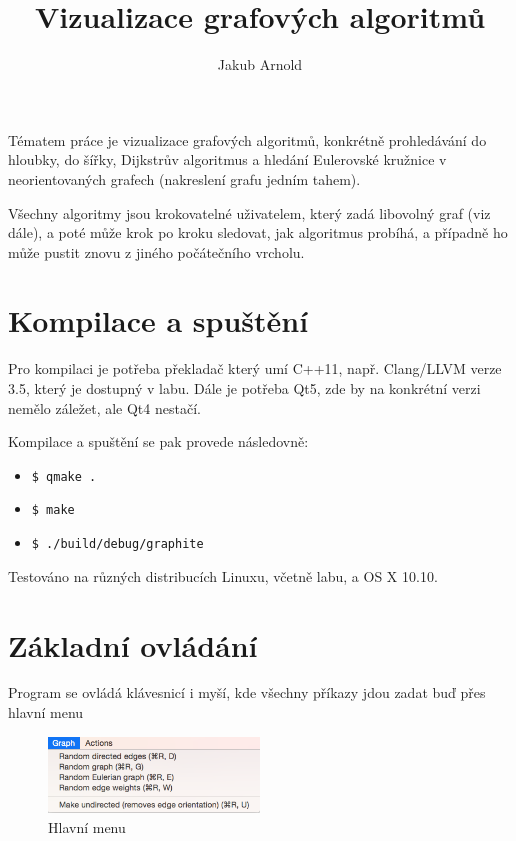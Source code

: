\documentclass{article}
\title{Vizualizace grafových algoritmů}
\author{Jakub Arnold}
\date{}
\def\code#1{\texttt{#1}}
\begin{document}
\maketitle

Tématem práce je vizualizace grafových algoritmů, konkrétně prohledávání
do hloubky, do šířky, Dijkstrův algoritmus a hledání Eulerovské kružnice
v neorientovaných grafech (nakreslení grafu jedním tahem).

Všechny algoritmy jsou krokovatelné uživatelem, který zadá libovolný
graf (viz dále), a poté může krok po kroku sledovat, jak algoritmus
probíhá, a případně ho může pustit znovu z jiného počátečního vrcholu.

\section{Kompilace a spuštění}

Pro kompilaci je potřeba překladač který umí C++11, např. Clang/LLVM
verze 3.5, který je dostupný v labu. Dále je potřeba Qt5, zde by na
konkrétní verzi nemělo záležet, ale Qt4 nestačí.

Kompilace a spuštění se pak provede následovně:

\begin{itemize}
  \item \code{\$ qmake .}
  \item \code{\$ make}
  \item \code{\$ ./build/debug/graphite}
\end{itemize}

Testováno na různých distribucích Linuxu, včetně labu, a OS X 10.10.

\section{Základní ovládání}

Program se ovládá klávesnicí i myší, kde všechny příkazy jdou zadat buď
přes hlavní menu

\begin{figure}
  \centering
    \includegraphics[width=0.5\textwidth]{KJaB5S6.png}
  \caption{Hlavní menu}
\end{figure}
\end{document}
